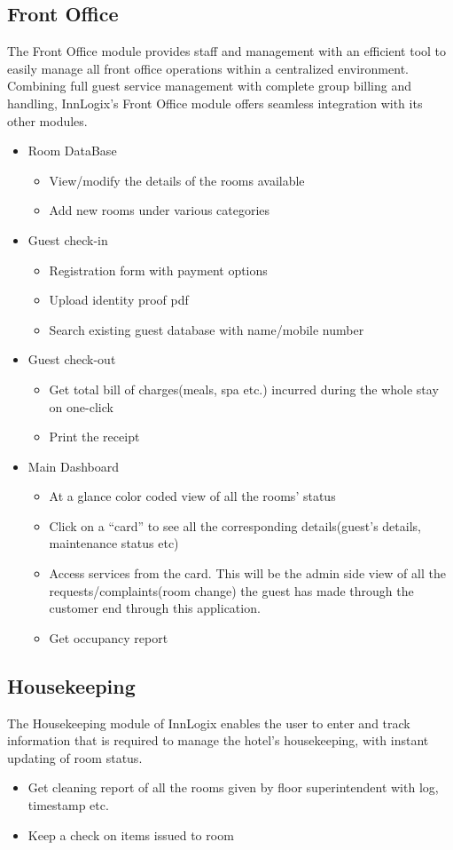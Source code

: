 \documentclass{scrreprt}
\begin{document}
\subsection{Front Office}
The Front Office module provides staff and management with an efficient tool to easily manage all front office operations within a centralized environment. Combining full guest service management with complete group billing and handling, InnLogix’s Front Office module offers seamless integration with its other modules.
\begin{itemize}
\item Room DataBase
\begin{itemize}
\item View/modify the details of the rooms available
\item Add new rooms under various categories
\end{itemize}
\item Guest check-in
\begin{itemize}
\item Registration form with payment options
\item Upload identity proof pdf
\item Search existing guest database with name/mobile number
\end{itemize}
\item Guest check-out
\begin{itemize}
\item Get total bill of charges(meals, spa etc.) incurred during the whole stay on one-click
\item Print the receipt
\end{itemize}
\item Main Dashboard
\begin{itemize}
    \item At a glance color coded view of all the rooms’ status
    \item Click on a “card” to see all the corresponding details(guest’s details, maintenance status etc)
    \item Access services from the card. This will be the admin side view of all the requests/complaints(room change) the guest has made through the customer end through this application.
    \item Get occupancy report
\end{itemize}
\end{itemize}

\subsection{Housekeeping}
The Housekeeping module of InnLogix enables the user to enter and track information that is required to manage the hotel’s housekeeping, with instant updating of room status.
\begin{itemize}
    \item Get cleaning report of all the rooms given by floor superintendent with log, timestamp etc.
    \item Keep a check on items issued to room
\end{itemize}
\end{document}
